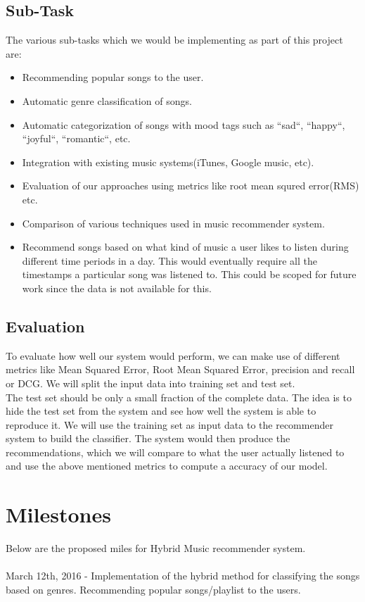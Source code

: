 \documentclass{sig-alternate-05-2015}
\begin{document}
\subsection{Sub-Task}
The various sub-tasks which we would be implementing as part of this project are:
\begin{itemize}
    \item Recommending popular songs to the user.
    \item Automatic genre classification of songs.
    \item Automatic categorization of  songs with mood tags such as ``sad``, ``happy``, ``joyful``, ``romantic``, etc.
    \item Integration with existing music systems(iTunes, Google music, etc).
    \item Evaluation of our approaches using metrics like root mean squred error(RMS) etc.
    \item Comparison of various techniques used in music recommender system.
    \item Recommend songs based on what kind of music a user likes to listen during different time periods in a day. This would eventually require all the timestamps a particular song was listened to. This could be scoped for future work since the data is not available for this.
\end{itemize}

\subsection{Evaluation}
To evaluate how well our system would perform, we can make use of different metrics like Mean Squared Error, Root Mean Squared Error, precision and recall or DCG. We will split the input data into training set and test set. \\

The test set should be only a small fraction of the complete data. The idea is to hide the test set from the system and see how well the system is able to reproduce it. We will use the training set as input data to the recommender system to build the classifier. The system would then produce the recommendations, which we will compare to what the user actually listened to and use the above mentioned metrics to compute a accuracy of our model.


\section{Milestones}
Below are the proposed miles for Hybrid Music recommender system.\\\\
March 12th, 2016 - Implementation of the hybrid method for classifying the songs based on genres. Recommending popular songs/playlist to the users.\\
\end{document}
